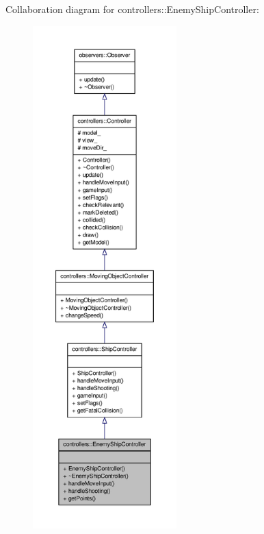 \-Collaboration diagram for controllers\-:\-:\-Enemy\-Ship\-Controller\-:
\nopagebreak
\begin{figure}[H]
\begin{center}
\leavevmode
\includegraphics[height=550pt]{d7/db4/classcontrollers_1_1EnemyShipController__coll__graph}
\end{center}
\end{figure}
